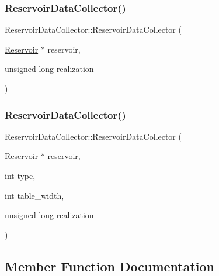 \subsubsection{\texorpdfstring{Reservoir\+Data\+Collector()}{ReservoirDataCollector()}\hspace{0.1cm}{\footnotesize\ttfamily [1/2]}}
{\footnotesize\ttfamily Reservoir\+Data\+Collector\+::\+Reservoir\+Data\+Collector (\begin{DoxyParamCaption}\item[{\mbox{\hyperlink{classReservoir}{Reservoir}} $\ast$}]{reservoir,  }\item[{unsigned long}]{realization }\end{DoxyParamCaption})\hspace{0.3cm}{\ttfamily [explicit]}}

\mbox{\label{classReservoirDataCollector_aaca132902fa717e71a0b0d5d5078c04c}} 
\subsubsection{\texorpdfstring{Reservoir\+Data\+Collector()}{ReservoirDataCollector()}\hspace{0.1cm}{\footnotesize\ttfamily [2/2]}}
{\footnotesize\ttfamily Reservoir\+Data\+Collector\+::\+Reservoir\+Data\+Collector (\begin{DoxyParamCaption}\item[{\mbox{\hyperlink{classReservoir}{Reservoir}} $\ast$}]{reservoir,  }\item[{int}]{type,  }\item[{int}]{table\+\_\+width,  }\item[{unsigned long}]{realization }\end{DoxyParamCaption})\hspace{0.3cm}{\ttfamily [explicit]}}



\subsection{Member Function Documentation}
\mbox{\label{classReservoirDataCollector_a5c2e1355c40e45b409168e98245eef95}} 
